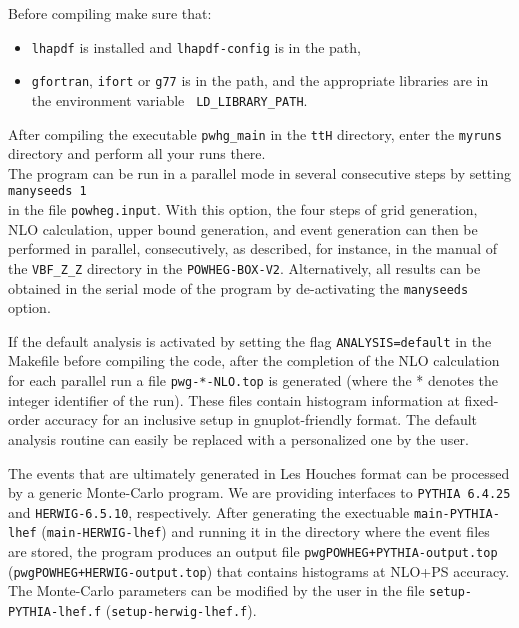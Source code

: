 \documentclass[a4paper,11pt]{article}
\newcommand\POWHEGBOXV{{\tt POWHEG-BOX-V2}}
\newcommand\PYTHIA{{\tt PYTHIA}}
\begin{document}
Before compiling make sure that:
\begin{itemize}
\item 
{\tt lhapdf} is installed and {\tt lhapdf-config} is in the path,
\item
{\tt gfortran}, {\tt ifort} or {\tt g77} is in the path, and the
appropriate libraries are in the environment variable {\tt
  LD\_LIBRARY\_PATH}. 
\end{itemize}
After compiling the executable {\tt pwhg\_main} in the {\tt ttH} directory, enter the {\tt myruns} directory and perform all your runs there. 
\\[2ex]
The program can be run in a parallel mode in several consecutive steps by setting 
\\[2ex]
{\tt manyseeds   1}
\\[2ex]
in the file  {\tt powheg.input}.  With this option, the four steps of grid generation, NLO calculation, upper bound generation, and event generation can then be performed in parallel, consecutively, as described, for instance, in the manual of the {\tt VBF\_Z\_Z} directory in the \POWHEGBOXV{}. Alternatively, all results can be obtained in the serial mode of the program by de-activating the  {\tt manyseeds} option. 

If the default analysis is activated by setting the flag 
{\tt ANALYSIS=default} in the Makefile before compiling the code, after the completion of the NLO calculation for each parallel run a file {\tt  pwg-*-NLO.top} is generated (where the * denotes the integer
identifier of the run). These files contain histogram information at fixed-order accuracy for an inclusive setup in gnuplot-friendly format. The default analysis routine can easily be replaced with a personalized one by the user.  

The events that are ultimately generated in Les Houches format can be processed by a generic Monte-Carlo program. We are providing interfaces to \PYTHIA~{\tt 6.4.25}  and {\tt HERWIG-6.5.10}, respectively. After generating the exectuable {\tt main-PYTHIA-lhef} ({\tt main-HERWIG-lhef}) and running it in the directory where the event files are stored, the program produces an output file {\tt pwgPOWHEG+PYTHIA-output.top} ({\tt pwgPOWHEG+HERWIG-output.top}) that contains histograms at NLO+PS accuracy. The Monte-Carlo parameters can be modified by the user in the file {\tt setup-PYTHIA-lhef.f} ({\tt setup-herwig-lhef.f}). 
\end{document}

